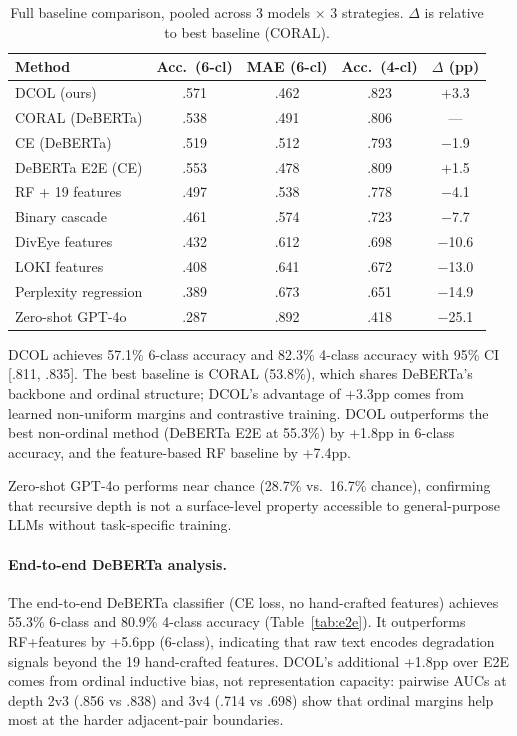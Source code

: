 \documentclass[11pt,a4paper]{article}
\begin{document}
\begin{table}[t]
\centering
\small
\caption{Full baseline comparison, pooled across 3 models $\times$ 3 strategies. $\Delta$ is relative to best baseline (CORAL).}
\label{tab:baselines}
\begin{tabular}{@{}lcccc@{}}
\toprule
\textbf{Method} & \textbf{Acc.\ (6-cl)} & \textbf{MAE (6-cl)} & \textbf{Acc.\ (4-cl)} & \textbf{$\Delta$ (pp)} \\
\midrule
DCOL (ours) & .571 & .462 & .823 & +3.3 \\
CORAL (DeBERTa) & .538 & .491 & .806 & --- \\
CE (DeBERTa) & .519 & .512 & .793 & $-$1.9 \\
DeBERTa E2E (CE) & .553 & .478 & .809 & +1.5 \\
RF + 19 features & .497 & .538 & .778 & $-$4.1 \\
Binary cascade & .461 & .574 & .723 & $-$7.7 \\
DivEye features & .432 & .612 & .698 & $-$10.6 \\
LOKI features & .408 & .641 & .672 & $-$13.0 \\
Perplexity regression & .389 & .673 & .651 & $-$14.9 \\
Zero-shot GPT-4o & .287 & .892 & .418 & $-$25.1 \\
\bottomrule
\end{tabular}
\end{table}

DCOL achieves 57.1\% 6-class accuracy and 82.3\% 4-class accuracy with 95\% CI [.811, .835].
The best baseline is CORAL (53.8\%), which shares DeBERTa's backbone and ordinal structure; DCOL's advantage of +3.3pp comes from learned non-uniform margins and contrastive training.
DCOL outperforms the best non-ordinal method (DeBERTa E2E at 55.3\%) by +1.8pp in 6-class accuracy, and the feature-based RF baseline by +7.4pp.

Zero-shot GPT-4o performs near chance (28.7\% vs.\ 16.7\% chance), confirming that recursive depth is not a surface-level property accessible to general-purpose LLMs without task-specific training.

\paragraph{End-to-end DeBERTa analysis.}
The end-to-end DeBERTa classifier (CE loss, no hand-crafted features) achieves 55.3\% 6-class and 80.9\% 4-class accuracy (Table~\ref{tab:e2e}).
It outperforms RF+features by +5.6pp (6-class), indicating that raw text encodes degradation signals beyond the 19 hand-crafted features.
DCOL's additional +1.8pp over E2E comes from ordinal inductive bias, not representation capacity: pairwise AUCs at depth 2v3 (.856 vs .838) and 3v4 (.714 vs .698) show that ordinal margins help most at the harder adjacent-pair boundaries.
\end{document}
